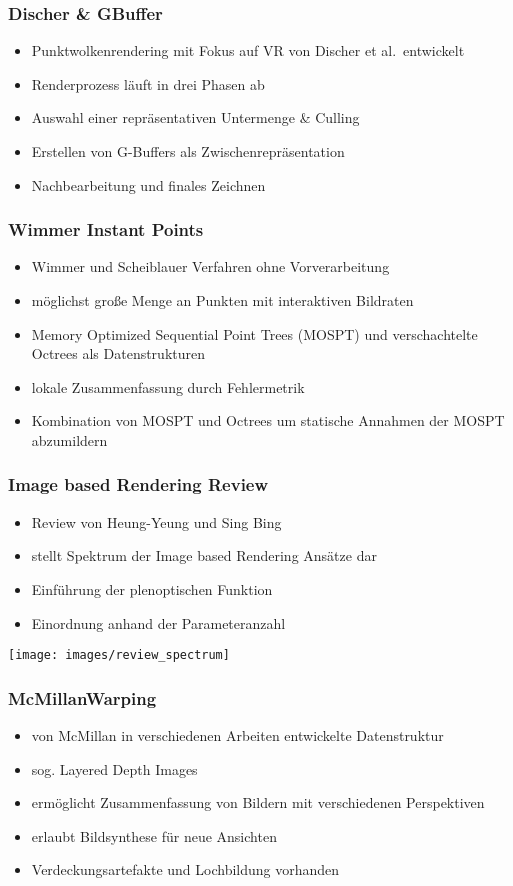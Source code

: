 \documentclass[aspectratio=169]{beamer}
\begin{document}
\begin{frame}
    \frametitle{Discher \& GBuffer}
    \begin{itemize}
        \item Punktwolkenrendering mit Fokus auf VR von Discher et al.\ entwickelt
        \item Renderprozess läuft in drei Phasen ab
        \item Auswahl einer repräsentativen Untermenge \& Culling
        \item Erstellen von G-Buffers als Zwischenrepräsentation
        \item Nachbearbeitung und finales Zeichnen
    \end{itemize}
\end{frame}

\begin{frame}
    \frametitle{Wimmer Instant Points}
    \begin{itemize}
        \item Wimmer und Scheiblauer Verfahren ohne Vorverarbeitung
        \item möglichst große Menge an Punkten mit interaktiven Bildraten
        \item Memory Optimized
        Sequential Point Trees (MOSPT) und verschachtelte Octrees als Datenstrukturen
        \item lokale Zusammenfassung durch Fehlermetrik
        \item Kombination von MOSPT und Octrees um statische Annahmen der MOSPT abzumildern
    \end{itemize}
\end{frame}

\begin{frame}
    \frametitle{Image based Rendering Review}
    \begin{itemize}
        \item Review von Heung-Yeung und Sing Bing
        \item stellt Spektrum der Image based Rendering Ansätze dar
        \item Einführung der plenoptischen Funktion
        \item Einordnung anhand der Parameteranzahl
    \end{itemize}
    \texttt{[image: images/review\_spectrum]}
\end{frame}

\begin{frame}
    \frametitle{McMillanWarping}
    \begin{itemize}
        \item von McMillan in verschiedenen Arbeiten entwickelte Datenstruktur
        \item sog. Layered Depth Images
        \item ermöglicht Zusammenfassung von Bildern mit verschiedenen Perspektiven
        \item erlaubt Bildsynthese für neue Ansichten
        \item Verdeckungsartefakte und Lochbildung vorhanden
    \end{itemize}
\end{frame}
\end{document}
